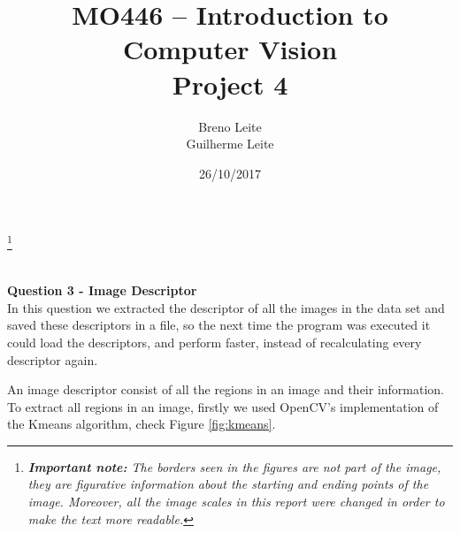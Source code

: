 \documentclass[12pt,a4paper]{article}
\title{MO446 -- Introduction to Computer Vision  \\ Project 4}
\author{Breno Leite  \\ Guilherme Leite}
\date{26/10/2017}
\newcommand\blfootnote[1]{%
	\begingroup
	\renewcommand\thefootnote{}\footnote{#1}%
	\addtocounter{footnote}{-1}%
	\endgroup
}
\begin{document}
\maketitle
\blfootnote{\textit{\textbf{Important note:} The borders seen in the figures are not part of the image, they are figurative information about the starting and ending points of the image. Moreover, all the image scales in this report were changed in order to make the text more readable.}} \\


\textbf{\LARGE Question 3 - Image Descriptor}\\

	In this question we extracted the descriptor of all the images in the data set and saved these descriptors in a file, so the next time the program was executed it could load the descriptors, and perform faster, instead of recalculating every descriptor again.

	An image descriptor consist of all the regions in an image and their information. To extract all regions in an image, firstly we used OpenCV's implementation of the Kmeans algorithm, check Figure \ref{fig:kmeans}.

\newpage
\end{document}
